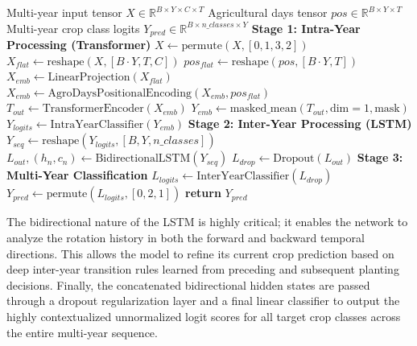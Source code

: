 \begin{algorithm}[htpb]
    \caption{Hierarchical Transformer-LSTM Forward Pass}
    \label{alg:hybrid_forward}
    \begin{algorithmic}[1]
        \Require Multi-year input tensor $X \in \mathbb{R}^{B \times Y \times C \times T}$
        \Require Agricultural days tensor $pos \in \mathbb{R}^{B \times Y \times T}$
        \Ensure Multi-year crop class logits $Y_{pred} \in \mathbb{R}^{B \times n\_classes \times Y}$
        \vspace{1.5mm}
        \State \textbf{Stage 1: Intra-Year Processing (Transformer)}
        \State $X \gets \text{permute}(X, [0, 1, 3, 2])$ 
        \State $X_{flat} \gets \text{reshape}(X, [B \cdot Y, T, C])$ 
        \State $pos_{flat} \gets \text{reshape}(pos, [B \cdot Y, T])$
        \State $X_{emb} \gets \text{LinearProjection}(X_{flat})$
        \State $X_{emb} \gets \text{AgroDaysPositionalEncoding}(X_{emb}, pos_{flat})$
        \State $T_{out} \gets \text{TransformerEncoder}(X_{emb})$ 
        \State $Y_{emb} \gets \text{masked\_mean}(T_{out}, \text{dim}=1, \text{mask})$ 
        \State $Y_{logits} \gets \text{IntraYearClassifier}(Y_{emb})$ 
        \vspace{1.5mm}
        \State \textbf{Stage 2: Inter-Year Processing (LSTM)}
        \State $Y_{seq} \gets \text{reshape}(Y_{logits}, [B, Y, n\_classes])$ 
        \State $L_{out}, (h_n, c_n) \gets \text{BidirectionalLSTM}(Y_{seq})$ 
        \State $L_{drop} \gets \text{Dropout}(L_{out})$ 
        \vspace{1.5mm}
        \State \textbf{Stage 3: Multi-Year Classification}
        \State $L_{logits} \gets \text{InterYearClassifier}(L_{drop})$ 
        \State $Y_{pred} \gets \text{permute}(L_{logits}, [0, 2, 1])$ 
        \State \textbf{return} $Y_{pred}$
    \end{algorithmic}
\end{algorithm}

The bidirectional nature of the LSTM is highly critical; it enables the network to analyze the rotation history in both the forward and backward temporal directions.
This allows the model to refine its current crop prediction based on deep inter-year transition rules learned from preceding and subsequent planting decisions.
Finally, the concatenated bidirectional hidden states are passed through a dropout regularization layer and a final linear classifier to output
the highly contextualized unnormalized logit scores for all target crop classes across the entire multi-year sequence.

